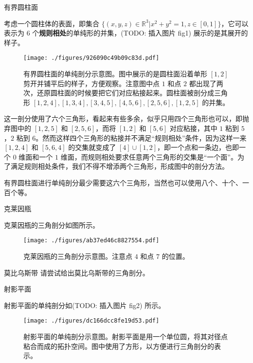\begin{example}{有界圆柱面}

考虑一个圆柱体的表面，即集合 $\{(x, y, z)\in\mathbb{R}^3|x^2+y^2=1, z\in [0, 1]\}$，它可以表示为 $6$ 个\textbf{规则相处}的单纯形的并集，(TODO: 插入图片 fig1) 展示的是其展开的样子。

\begin{figure}[ht]
\centering
\texttt{[image: ./figures/926090c49b09c83d.pdf]}
\caption{有界圆柱面的单纯剖分示意图。图中展示的是圆柱面沿着单形 $[1, 2]$ 剪开并铺平后的样子，方便观察。注意图中点 $1$ 和点 $2$ 都出现了两次，还原圆柱面的时候要把它们对应粘接起来。圆柱面被剖分成三角形 $[1,2,4], [1,3,4], [3,4,5], [4,5,6], [2,5,6], [1,2,5]$ 的并集。} \label{fig_SimCom_3}
\end{figure}


这一剖分使用了六个三角形，看起来有些多余，似乎只用四个三角形也可以，即抛弃图中的 $[1,2,5]$ 和 $[2,5,6]$，而将 $[1, 2]$ 和 $[5, 6]$ 对应粘接，其中 $1$ 粘到 $5$，$2$ 粘到 $6$。然而这样四个三角形的粘接并不满足“规则相处”条件，因为这样一来 $[1, 2, 4]$ 和 $[5, 6, 4]$ 的交集就变成了 $[4]\cup[1, 2]$，即一个点和一条边，也即一个 $0$ 维面和一个 $1$ 维面，而规则相处要求任意两个三角形的交集是“一个面”。为了满足规则相处条件，我们不得不增添两个三角形，形成图中的剖分方法。



有界圆柱面进行单纯剖分最少需要这六个三角形，当然也可以使用八个、十个、一百个等。

\end{example}


\begin{example}{克莱因瓶}

克莱因瓶的三角剖分如图所示。

\begin{figure}[ht]
\centering
\texttt{[image: ./figures/ab37ed46c8827554.pdf]}
\caption{克莱因瓶的三角剖分示意图。注意点 $4$ 和点 $7$ 的位置。} \label{fig_SimCom_5}
\end{figure}

\end{example}


\begin{exercise}{莫比乌斯带}
请尝试给出莫比乌斯带的三角剖分。
\end{exercise}


\begin{example}{射影平面}

射影平面的单纯剖分如(TODO: 插入图片 fig2) 所示。

\begin{figure}[ht]
\centering
\texttt{[image: ./figures/dc166dcc8fe19d53.pdf]}
\caption{射影平面的单纯剖分示意图。射影平面是用一个单位圆，将其对径点粘合而成的拓扑空间。图中使用了方形，以方便进行三角剖分的表示。} \label{fig_SimCom_4}
\end{figure}

\end{example}

